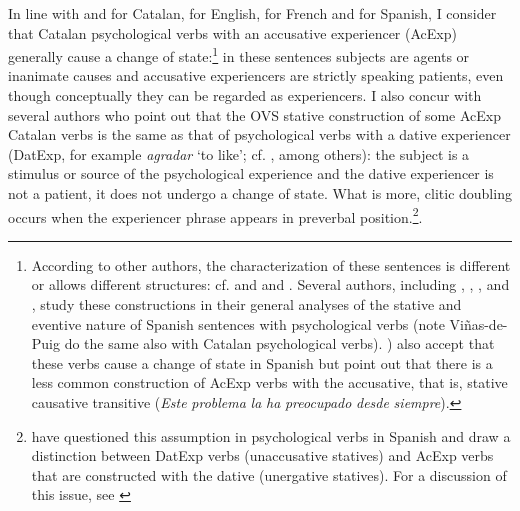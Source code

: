 \documentclass[output=paper,colorlinks,citecolor=brown,nonflat]{./langscibook}
\begin{document}
In line with \citet{Ynglès1991, CabréMateu1998, Rossello2008} and \citet[Section 21.5]{GIEC2016} for Catalan, \citet{Pesetsky1995} for English, \citet{Bouchard1995} for French and \citet{Acedo-MatellánMateu2015} for Spanish, I consider that Catalan psychological verbs with an accusative experiencer (AcExp) generally cause a change of state:\footnote{According to other authors, the characterization of these sentences is different or allows different structures: cf. \citet{vanVoorst1992, Arad1999, Landau2010} and \citet{MarínMcNally2011} and \citet{Fabregas2015experimentante}. Several authors, including \citet{FabregasMarín2012},  \citet{FábregasMarínMcNally2012}, \citet{MarínSanchezMarco2012}, \citet{Ganeshan2014} and \citet{Viñas-de-Puig2014}, study these constructions in their general analyses of the stative and eventive nature of Spanish sentences with psychological verbs (note Viñas-de-Puig do the same also with Catalan psychological verbs). \citet[83]{Acedo-MatellánMateu2015} ) also accept that these verbs cause a change of state in Spanish but point out that there is a less common construction of AcExp verbs with the accusative, that is, stative causative transitive (\textit{Este} \textit{problema} \textit{la} \textit{ha} \textit{preocupado} \textit{desde} \textit{siempre}).} in these sentences subjects are agents or inanimate causes and accusative experiencers are strictly speaking patients, even though conceptually they can be regarded as experiencers. I also concur with several authors who point out that the OVS stative construction of some AcExp Catalan verbs is the same as that of psychological verbs with a dative experiencer (DatExp, for example \textit{agradar} ‘to like’; cf. \citealt{CabréMateu1998, Ramos2004, Rossello2008, Cuervo2010Cuestiones}, among others): the subject is a stimulus or source of the psychological experience and the dative experiencer is not a patient, it does not undergo a change of state. What is more, clitic doubling occurs when the experiencer phrase appears in preverbal position.\footnote{\citet{Acedo-MatellánMateu2015} have questioned this assumption in psychological verbs in Spanish and draw a distinction between DatExp verbs (unaccusative statives) and AcExp verbs that are constructed with the dative (unergative statives). For a discussion of this issue, see \citet[Section 6.2.4.1]{Royo2017}}.
\end{document}
